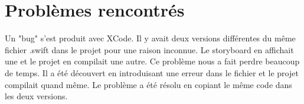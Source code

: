 \section{Problèmes rencontrés}
Un "bug" s'est produit avec XCode. Il y avait deux versions différentes du même fichier .swift dans le projet pour une raison inconnue. Le storyboard en affichait une et le projet en compilait une autre. Ce problème nous a fait perdre beaucoup de temps. Il a été découvert en introduisant une erreur dans le fichier et le projet compilait quand même. Le problème a été résolu en copiant le même code dans les deux versions.
